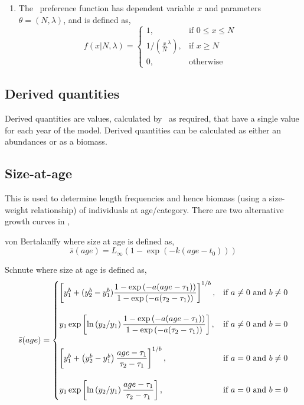 \begin{enumerate}
\item The \ preference function has dependent variable $x$ and parameters $\theta = (N,\lambda)$, and is defined as,
\begin{equation}
  f(x | N, \lambda) = \begin{cases}
    1, & \text{if $0 \le x \leq N$} \\
    1/\left({\frac{x}{N}}^\lambda\right), & \text{if $x \ge N$}\\
    0, & \text{otherwise}
  \end{cases}
\end{equation}

\end{enumerate}

\subsection{Derived quantities\label{sec:derived-quantities}}

Derived quantities are values, calculated by \SPM\ as required, that have a single value for each year of the model. Derived quantities can be calculated as either an abundances or as a biomass.

\subsection{Size-at-age\label{sec:size-at-age}}

This is used to determine length frequencies and hence biomass (using a size-weight relationship) of individuals at age/category. There are two alternative growth curves in \SPM, 

\begin{description}
\item{von Bertalanffy} where size at age is defined as,
\begin{equation} 
\bar{s}(age)= L_\infty \left( 1 - \exp \left( -k \left(age-t_0 \right) \right) \right)
\end{equation}

\item{Schnute} where size at age is defined as,
\begin{equation}
\bar{s}(age)=\displaystyle\begin{cases}
  \left[ y_1^b + (y_2^b - y_1^b) \dfrac{1-\exp \left(-a(age - \tau_1) \right)}{1-\exp \left(-a(\tau_2 - \tau_1) \right)} \right]^{1/b}, & \text{if $a\ne0$ and $b\ne0$} \\
  \AddVspace
  y_1 \exp \left[ \ln \left( y_2 / y_1 \right) \dfrac{1-\exp \left(-a(age - \tau_1) \right)}{1-\exp \left(-a(\tau_2 - \tau_1) \right)} \right], & \text{if $a\ne0$ and $b=0$} \\
  \AddVspace
  \left[ y_1^b + \left( y_2^b - y_1^b \right) \dfrac{age-\tau_1}{\tau_2 - \tau_1} \right]^{1/b}, & \text{if $a=0$ and $b\ne0$} \\
  \AddVspace
  y_1 \exp \left[ \ln \left( y_2/y_1 \right) \dfrac{age-\tau_1}{\tau_2 - \tau_1} \right] , & \text{if $a=0$ and $b=0$} \\
  \end{cases}
\end{equation}
\end{description}

